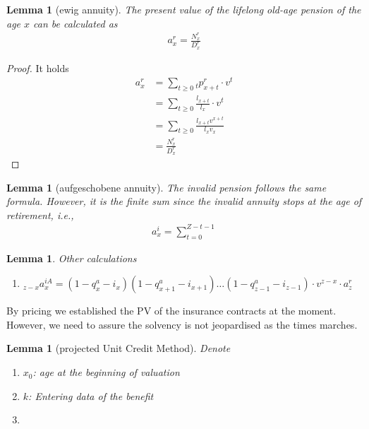 \documentclass[a4paper,11pt]{book}
\newtheorem{lemma}[theorem]{Lemma}
\theoremstyle{definition}
\theoremstyle{remark}
\begin{document}
\begin{lemma}[ewig annuity]
	The present value of the lifelong old-age pension of the age $x$ can be calculated as 
	\begin{align*}
		a_x^r=  \frac{N_x^r}{D_x^r}
	\end{align*}
\end{lemma}
\begin{proof}
It holds
\begin{align*}
	a_x^r &= \sum_{t \ge 0} {}_tp_{x + t}^r \cdot v^t \\
	& = \sum_{t \ge 0} \frac{l_{x + t}}{l_x} \cdot v^t \\
	& = \sum_{ t \ge 0} \frac{l_{x + t} v^{x + t}}{l_x v_x} \\
	& = \frac{N_x^r}{D_x^r}
\end{align*}
\end{proof}

\begin{lemma}[aufgeschobene annuity]
	The invalid pension follows the same formula. However, it is the finite sum since the invalid annuity stops at the age of retirement, i.e., 
	\begin{align*}
		a_x^i = \sum_{t = 0}^{Z - t - 1}
	\end{align*}	
\end{lemma}

\begin{lemma}
	Other calculations
	\begin{enumerate}
		\item ${}_{z - x} a_x^{iA} = ( 1- q_x^a - i_x)(1 - q_{x + 1}^a - i_{x + 1}) \dots (1 - q_{z - 1}^a - i_{z - 1}) \cdot v^{z - x} \cdot a_z^r$
	\end{enumerate}
\end{lemma}


By pricing we established the PV of the insurance contracts at the moment. However, we need to assure the solvency is not jeopardised as the times marches. 



\begin{lemma}[projected Unit Credit Method]
	Denote 
	\begin{enumerate}
		\item $x_0$: age at the beginning of valuation
		\item $k$: Entering data of the benefit
		\item 
	\end{enumerate}
\end{lemma}
\end{document}
